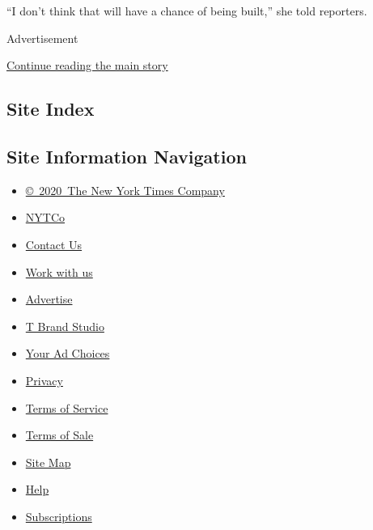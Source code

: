 ``I don't think that will have a chance of being built,'' she told
reporters.

Advertisement

\protect\hyperlink{after-bottom}{Continue reading the main story}

\hypertarget{site-index}{%
\subsection{Site Index}\label{site-index}}

\hypertarget{site-information-navigation}{%
\subsection{Site Information
Navigation}\label{site-information-navigation}}

\begin{itemize}
\tightlist
\item
  \href{https://help.nytimes.com/hc/en-us/articles/115014792127-Copyright-notice}{©~2020~The
  New York Times Company}
\end{itemize}

\begin{itemize}
\tightlist
\item
  \href{https://www.nytco.com/}{NYTCo}
\item
  \href{https://help.nytimes.com/hc/en-us/articles/115015385887-Contact-Us}{Contact
  Us}
\item
  \href{https://www.nytco.com/careers/}{Work with us}
\item
  \href{https://nytmediakit.com/}{Advertise}
\item
  \href{http://www.tbrandstudio.com/}{T Brand Studio}
\item
  \href{https://www.nytimes.com/privacy/cookie-policy\#how-do-i-manage-trackers}{Your
  Ad Choices}
\item
  \href{https://www.nytimes.com/privacy}{Privacy}
\item
  \href{https://help.nytimes.com/hc/en-us/articles/115014893428-Terms-of-service}{Terms
  of Service}
\item
  \href{https://help.nytimes.com/hc/en-us/articles/115014893968-Terms-of-sale}{Terms
  of Sale}
\item
  \href{https://spiderbites.nytimes.com}{Site Map}
\item
  \href{https://help.nytimes.com/hc/en-us}{Help}
\item
  \href{https://www.nytimes.com/subscription?campaignId=37WXW}{Subscriptions}
\end{itemize}
